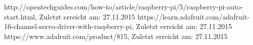 \documentclass[a4paper,10pt]{scrartcl}
\begin{document}
  \begin{thebibliography}{9}
      http://opentechguides.com/how-to/article/raspberry-pi/5/raspberry-pi-auto-start.html,
      Zuletzt erreicht am: 27.11.2015
      https://learn.adafruit.com/adafruit-16-channel-servo-driver-with-raspberry-pi,
      Zuletzt erreicht am: 27.11.2015
      https://www.adafruit.com/product/815,
      Zuletzt erreicht am: 27.11.2015
  \end{thebibliography}
\end{document}
